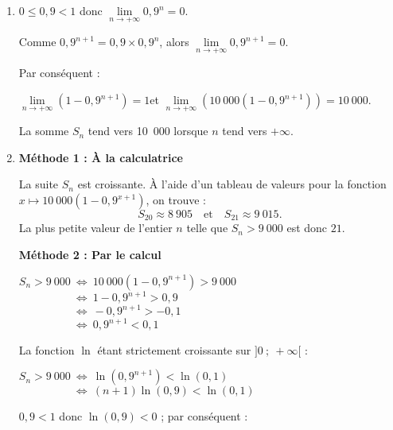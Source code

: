 \begin{corrige}
\begin{enumerate}
          \par
          $S_{10}=10~000 \left( 1-0,9^{11} \right) \approx 6~862~$ (arrondi à l'unité).
          \item
          $0 \leqslant 0,9 < 1$ donc $\lim\limits_{n \rightarrow +\infty}0,9 ^n = 0$.
          \par
          Comme $0,9^{n+1} = 0,9 \times 0,9 ^n$, alors ${\lim\limits_{n \rightarrow +\infty}0,9 ^{n+1} = 0}$.
          \par
          Par conséquent :
          \par
          ${\lim\limits_{n \rightarrow +\infty}\left(1-0,9 ^{n+1}\right) = 1}$\quad et \quad${\lim\limits_{n \rightarrow +\infty}\left(10~000 \left( 1-0,9^{n+1} \right)\right) = 10~000}$.
          \par
          La somme $S_n$ tend vers 10~000 lorsque $n$ tend vers $+\infty$.
          \item
          \textbf{Méthode 1 : \`A la calculatrice}
          \par
          La suite $S_n$ est croissante. \`A l'aide d'un tableau de valeurs pour la fonction $x \longmapsto 10~000 \left( 1-0,9^{x+1} \right)$, on trouve :
          \[ S_{20} \approx 8~905 \quad \text{et} \quad S_{21} \approx 9~015. \]
          La plus petite valeur de l'entier $n$ telle que $S_n > 9~000$ est donc $21$.
          \vspace{0.5cm}
          \par
          \textbf{Méthode 2 : Par le calcul}
          \par
          $S_n > 9~000 ~ \Leftrightarrow ~10~000 \left( 1-0,9^{n+1}\right) > 9~000 $\\
          $	\phantom{S_n > 9~000 ~} \Leftrightarrow ~ 1-0,9^{n+1} > 0,9$ \\
          $	\phantom{S_n > 9~000 ~}  \Leftrightarrow ~ -0,9^{n+1} > - 0,1$ \\
          $	\phantom{S_n > 9~000 ~}  \Leftrightarrow ~ 0,9^{n+1} < 0,1 $
          \par
          La fonction $\ln$ étant strictement croissante sur $]0~;~+\infty[$ :
          \par
          $S_n > 9~000 ~ \Leftrightarrow ~ \ln \left(0,9^{n+1} \right) < \ln (0,1) $ \\
          $\phantom{S_n > 9~000 ~ } \Leftrightarrow ~ (n+1)\ln (0,9) < \ln (0,1)$
          \par
          $0,9 < 1$ donc $\ln (0,9) < 0$ ; par conséquent :
          \par

\end{enumerate}
\end{corrige}
